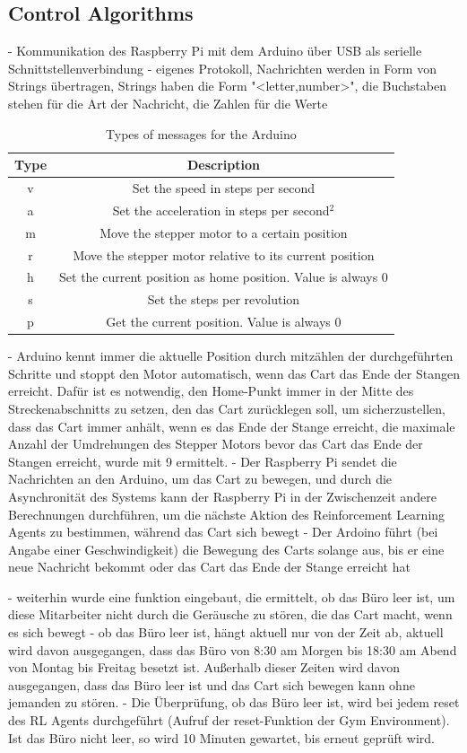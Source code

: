 \subsection{Control Algorithms}
- Kommunikation des Raspberry Pi mit dem Arduino über USB als serielle Schnittstellenverbindung
- eigenes Protokoll, Nachrichten werden in Form von Strings übertragen, Strings haben die Form "<letter,number>", die Buchstaben stehen für die Art der Nachricht, die Zahlen für die Werte
\begin{table}
    \caption{Types of messages for the Arduino}
    \label{tab:types_of_messages}
    \begin{tabular}{|c|c|}
        \hline
        Type & Description \\
        \hline
        v & Set the speed in steps per second \\
        a & Set the acceleration in steps per second$^2$ \\
        m & Move the stepper motor to a certain position \\
        r & Move the stepper motor relative to its current position \\
        h & Set the current position as home position. Value is always 0 \\
        s & Set the steps per revolution \\
        p & Get the current position. Value is always 0 \\
        \hline
    \end{tabular}
    \end{table}
- Arduino kennt immer die aktuelle Position durch mitzählen der durchgeführten Schritte und stoppt den Motor automatisch, wenn das Cart das Ende der Stangen erreicht. Dafür ist es notwendig, den Home-Punkt immer in der Mitte des Streckenabschnitts zu setzen, den das Cart zurücklegen soll, um sicherzustellen, dass das Cart immer anhält, wenn es das Ende der Stange erreicht, die maximale Anzahl der Umdrehungen des Stepper Motors bevor das Cart das Ende der Stangen erreicht, wurde mit 9 ermittelt.
- Der Raspberry Pi sendet die Nachrichten an den Arduino, um das Cart zu bewegen, und durch die Asynchronität des Systems kann der Raspberry Pi in der Zwischenzeit andere Berechnungen durchführen, um die nächste Aktion des Reinforcement Learning Agents zu bestimmen, während das Cart sich bewegt
- Der Ardoino führt (bei Angabe einer Geschwindigkeit) die Bewegung des Carts solange aus, bis er eine neue Nachricht bekommt oder das Cart das Ende der Stange erreicht hat

- weiterhin wurde eine funktion eingebaut, die ermittelt, ob das Büro leer ist, um diese Mitarbeiter nicht durch die Geräusche zu stören, die das Cart macht, wenn es sich bewegt
- ob das Büro leer ist, hängt aktuell nur von der Zeit ab, aktuell wird davon ausgegangen, dass das Büro von 8:30 am Morgen bis 18:30 am Abend von Montag bis Freitag besetzt ist. Außerhalb dieser Zeiten wird davon ausgegangen, dass das Büro leer ist und das Cart sich bewegen kann ohne jemanden zu stören.
- Die Überprüfung, ob das Büro leer ist, wird bei jedem reset des RL Agents durchgeführt (Aufruf der reset-Funktion der Gym Environment). Ist das Büro nicht leer, so wird 10 Minuten gewartet, bis erneut geprüft wird.
